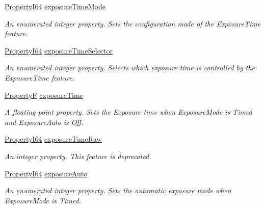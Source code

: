 \begin{DoxyCompactItemize}
\hyperlink{group___common_interface_ga81749b2696755513663492664a18a893}{Property\+I64} \hyperlink{classmv_i_m_p_a_c_t_1_1acquire_1_1_gen_i_cam_1_1_acquisition_control_a98235de35e157788e0ca8618f2cf06e5}{exposure\+Time\+Mode}
\begin{DoxyCompactList}\small\item\em An enumerated integer property. Sets the configuration mode of the Exposure\+Time feature. \end{DoxyCompactList}\item 
\hyperlink{group___common_interface_ga81749b2696755513663492664a18a893}{Property\+I64} \hyperlink{classmv_i_m_p_a_c_t_1_1acquire_1_1_gen_i_cam_1_1_acquisition_control_a2c75217c0225d5c95c88c1dcea7ed2a4}{exposure\+Time\+Selector}
\begin{DoxyCompactList}\small\item\em An enumerated integer property. Selects which exposure time is controlled by the Exposure\+Time feature. \end{DoxyCompactList}\item 
\hyperlink{group___common_interface_gaf54865fe5a3d5cfd15f9a111b40d09f9}{Property\+F} \hyperlink{classmv_i_m_p_a_c_t_1_1acquire_1_1_gen_i_cam_1_1_acquisition_control_a3c77b0606062196e0bdd0e1a526e9d27}{exposure\+Time}
\begin{DoxyCompactList}\small\item\em A floating point property. Sets the Exposure time when Exposure\+Mode is Timed and Exposure\+Auto is Off. \end{DoxyCompactList}\item 
\hyperlink{group___common_interface_ga81749b2696755513663492664a18a893}{Property\+I64} \hyperlink{classmv_i_m_p_a_c_t_1_1acquire_1_1_gen_i_cam_1_1_acquisition_control_aec552f1617c6891948e38f9aab39b760}{exposure\+Time\+Raw}
\begin{DoxyCompactList}\small\item\em An integer property. This feature is deprecated. \end{DoxyCompactList}\item 
\hyperlink{group___common_interface_ga81749b2696755513663492664a18a893}{Property\+I64} \hyperlink{classmv_i_m_p_a_c_t_1_1acquire_1_1_gen_i_cam_1_1_acquisition_control_a4c702e88d0591dbebff925de205138b4}{exposure\+Auto}
\begin{DoxyCompactList}\small\item\em An enumerated integer property. Sets the automatic exposure mode when Exposure\+Mode is Timed. \end{DoxyCompactList}\item 

\end{DoxyCompactItemize}
